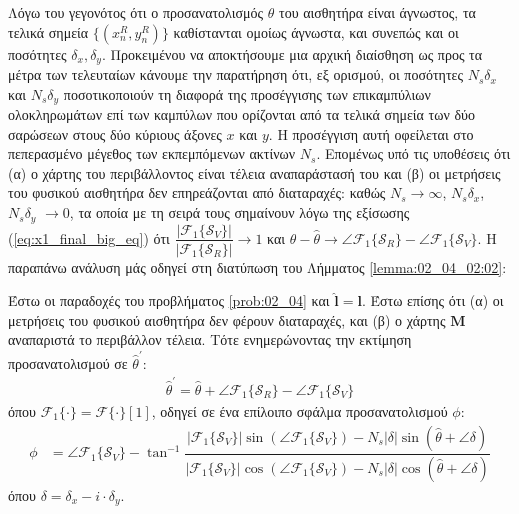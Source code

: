 Λόγω του γεγονότος ότι ο προσανατολισμός $\theta$ του αισθητήρα είναι άγνωστος,
τα τελικά σημεία $\{(x_n^R,y_n^R)\}$ καθίστανται ομοίως άγνωστα, και συνεπώς
και οι ποσότητες $\delta_x, \delta_y$. Προκειμένου να αποκτήσουμε μια αρχική
διαίσθηση ως προς τα μέτρα των τελευταίων κάνουμε την παρατήρηση ότι, εξ
ορισμού, οι ποσότητες $N_s \delta_x$ και $N_s \delta_y$ ποσοτικοποιούν τη
διαφορά της προσέγγισης των επικαμπύλιων ολοκληρωμάτων επί των καμπύλων που
ορίζονται από τα τελικά σημεία των δύο σαρώσεων στους δύο κύριους άξονες $x$
και $y$.  Η προσέγγιση αυτή οφείλεται στο πεπερασμένο μέγεθος των εκπεμπόμενων
ακτίνων $N_s$. Επομένως υπό τις υποθέσεις ότι (α) ο χάρτης του περιβάλλοντος
είναι τέλεια αναπαράστασή του και (β) οι μετρήσεις του φυσικού αισθητήρα δεν
επηρεάζονται από διαταραχές: καθώς $N_s \rightarrow \infty$, $N_s \delta_x$,
$N_s \delta_y$ $\rightarrow 0$, τα οποία με τη σειρά τους σημαίνουν λόγω της
εξίσωσης (\ref{eq:x1_final_big_eq}) ότι
$\dfrac{|\mathcal{F}_1\{\mathcal{S}_V\}|}{|\mathcal{F}_1\{\mathcal{S}_R\}|}
\rightarrow 1$ και $\theta-\hat{\theta} \rightarrow \angle
\mathcal{F}_1\{\mathcal{S}_R\} - \angle \mathcal{F}_1\{\mathcal{S}_V\}$.
Η παραπάνω ανάλυση μάς οδηγεί στη διατύπωση του Λήμματος \ref{lemma:02_04_02:02}:

\begin{lemma}
  Έστω οι παραδοχές του προβλήματος \ref{prob:02_04} και $\hat{\bm{l}} = \bm{l}$.
  Έστω επίσης ότι (α) οι μετρήσεις του φυσικού αισθητήρα δεν φέρουν
  διαταραχές, και (β) ο χάρτης $\bm{M}$ αναπαριστά το περιβάλλον τέλεια. Τότε
  ενημερώνοντας την εκτίμηση προσανατολισμού σε $\hat{\theta}^\prime$:
  \begin{align}
  \hat{\theta}^\prime = \hat{\theta} + \angle \mathcal{F}_1\{\mathcal{S}_R\} - \angle\mathcal{F}_1\{\mathcal{S}_V\}
    \label{eq:update_t2}
  \end{align}
  όπου $\mathcal{F}_1\{\cdot\} = \mathcal{F}\{\cdot\} [1]$,
  οδηγεί σε ένα επίλοιπο σφάλμα προσανατολισμού $\phi$:
  \begin{align}
    \phi &= \angle \mathcal{F}_1\{\mathcal{S}_V\} - \tan^{-1}\dfrac{|\mathcal{F}_1\{\mathcal{S}_V\}| \sin(\angle \mathcal{F}_1\{\mathcal{S}_V\})-N_s |\delta| \sin(\hat{\theta} + \angle \delta)}
                                                                 {|\mathcal{F}_1\{\mathcal{S}_V\}| \cos(\angle \mathcal{F}_1\{\mathcal{S}_V\})-N_s |\delta| \cos(\hat{\theta} + \angle \delta)} \label{eq:phi2}
  \end{align}
  όπου $\delta = \delta_x - i \cdot \delta_y$.
  \label{lemma:02_04_02:02}
\end{lemma}

